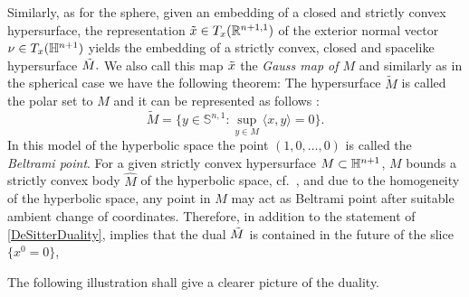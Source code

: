 Similarly, as for the sphere, given an embedding
of a closed and strictly convex hypersurface, the representation $\~x\in T_x(\R^{n+1,1})$ of the exterior normal vector $\nu\in T_x(\H^{n+1})$ yields the embedding
of a strictly convex, closed and spacelike hypersurface $\~M.$
We also call this map $\~x$ the {\it{Gauss map of $M$}} and similarly as in the spherical case we have the following theorem:
The hypersurface $\tilde{M}$ is called the polar set to $M$ and it can be represented as follows \cite[Thm.~10.4.8]{Gerhardt:/2006}:
$$\tilde{M}=\{y\in \mathbb{S}^{n,1}: \sup_{y\in M}\langle x,y\rangle=0\}.$$
In this model of the hyperbolic space the point $(1,0,\ldots,0)$ is called the {\it{Beltrami point}}. For a given strictly convex hypersurface $M\sub\H^{n+1}$, $M$ bounds a strictly convex body $\hat{M}$ of the hyperbolic space, cf.~\cite[Thm.~10.3.1]{Gerhardt:/2006}, and due to the homogeneity of the hyperbolic space, any point in $\hat{M}$ may act as Beltrami point after suitable ambient change of coordinates. Therefore, in addition to the statement of \cref{DeSitterDuality}, \cite[Thm.~10.4.9.]{Gerhardt:/2006} implies that the dual $\~M$ is contained in the future of the slice $\{x^0=0\}$,

The following illustration shall give a clearer picture of the duality.
